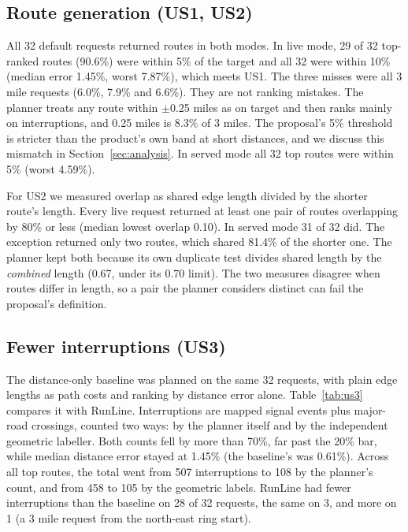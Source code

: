 \subsection{Route generation (US1, US2)}
All 32 default requests returned routes in both modes. In live mode, 29 of
32 top-ranked routes (90.6\%) were within 5\% of the target and all 32 were
within 10\% (median error 1.45\%, worst 7.87\%), which meets US1. The three
misses were all 3 mile requests (6.0\%, 7.9\% and 6.6\%). They are not
ranking mistakes. The planner treats any route within $\pm$0.25 miles as on
target and then ranks mainly on interruptions, and 0.25 miles is 8.3\% of
3 miles. The proposal's 5\% threshold is stricter than the product's own band
at short distances, and we discuss this mismatch in
Section~\ref{sec:analysis}. In served mode all 32 top routes were within 5\%
(worst 4.59\%).

For US2 we measured overlap as shared edge length divided by the shorter
route's length. Every live request returned at least one pair of routes
overlapping by 80\% or less (median lowest overlap 0.10). In served mode
31 of 32 did. The exception returned only two routes, which shared 81.4\% of
the shorter one. The planner kept both because its own duplicate test
divides shared length by the \emph{combined} length (0.67, under its 0.70
limit). The two measures disagree when routes differ in length, so a pair
the planner considers distinct can fail the proposal's definition.

\subsection{Fewer interruptions (US3)}
The distance-only baseline was planned on the same 32 requests, with plain
edge lengths as path costs and ranking by distance error alone.
Table~\ref{tab:us3} compares it with RunLine. Interruptions are mapped signal
events plus major-road crossings, counted two ways: by the planner itself
and by the independent geometric labeller. Both counts fell by more than
70\%, far past the 20\% bar, while median distance error stayed at 1.45\%
(the baseline's was 0.61\%). Across all top routes, the total went from 507
interruptions to 108 by the planner's count, and from 458 to 105 by the
geometric labels. RunLine had fewer interruptions than the baseline on 28 of
32 requests, the same on 3, and more on 1 (a 3 mile request from the
north-east ring start).

